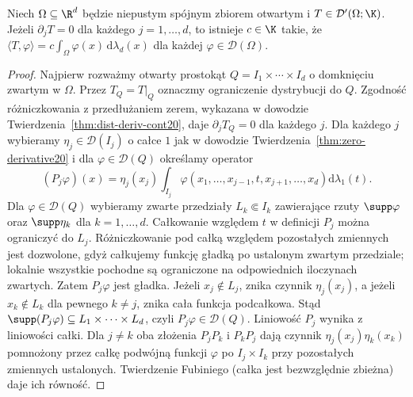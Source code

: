 \begin{twierdzenie}
\label{thm:zero-gradient20}
Niech $\Omega\subseteq\R^d$ będzie niepustym spójnym
zbiorem otwartym i $T\in\mathcal D'(\Omega;\K)$.
Jeżeli $\partial_jT=0$ dla każdego $j=1,\ldots,d$,
to istnieje $c\in\K$ takie, że
$\langle T,\varphi\rangle=c\int_\Omega\varphi(x)\,
\mathrm d\lambda_d(x)$ dla każdej $\varphi\in\mathcal D(\Omega)$.
\end{twierdzenie}
\begin{proof}
Najpierw rozważmy otwarty prostokąt
$Q=I_1\times\cdots\times I_d$ o domknięciu zwartym w $\Omega$.
Przez $T_Q=T|_Q$ oznaczmy ograniczenie dystrybucji do $Q$.
Zgodność różniczkowania z przedłużaniem zerem, wykazana
w dowodzie Twierdzenia~\ref{thm:dist-deriv-cont20},
daje $\partial_jT_Q=0$ dla każdego $j$.
Dla każdego $j$ wybieramy $\eta_j\in\mathcal D(I_j)$
o całce $1$ jak w dowodzie Twierdzenia~\ref{thm:zero-derivative20}
i dla $\varphi\in\mathcal D(Q)$ określamy operator
\[
 (P_j\varphi)(x)=\eta_j(x_j)
 \int_{I_j}\varphi(x_1,\ldots,x_{j-1},t,x_{j+1},\ldots,x_d)
 \mathrm d\lambda_1(t).
\]
Dla $\varphi\in\mathcal D(Q)$ wybieramy zwarte przedziały
$L_k\Subset I_k$ zawierające rzuty $\supp\varphi$
oraz $\supp\eta_k$ dla $k=1,\ldots,d$.
Całkowanie względem $t$ w definicji $P_j$ można ograniczyć
do $L_j$. Różniczkowanie pod całką względem pozostałych
zmiennych jest dozwolone, gdyż całkujemy funkcję gładką
po ustalonym zwartym przedziale; lokalnie wszystkie
pochodne są ograniczone na odpowiednich iloczynach zwartych.
Zatem $P_j\varphi$ jest gładka.
Jeżeli $x_j\notin L_j$, znika czynnik $\eta_j(x_j)$,
a jeżeli $x_k\notin L_k$ dla pewnego $k\ne j$, znika cała
funkcja podcałkowa. Stąd $\supp(P_j\varphi)\subseteq
L_1\times\cdots\times L_d$, czyli $P_j\varphi\in\mathcal D(Q)$.
Liniowość $P_j$ wynika z liniowości całki.
Dla $j\ne k$ oba złożenia $P_jP_k$ i $P_kP_j$ dają
czynnik $\eta_j(x_j)\eta_k(x_k)$ pomnożony przez całkę
podwójną funkcji $\varphi$ po $I_j\times I_k$ przy pozostałych
zmiennych ustalonych. Twierdzenie Fubiniego (całka jest
bezwzględnie zbieżna) daje ich równość.


\end{proof}

